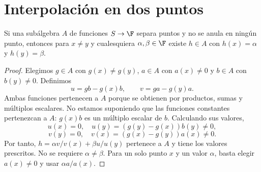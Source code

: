 \section{Interpolación en dos puntos}
\begin{lema}\label{ch28:interpolacion}
Si una subálgebra $A$ de funciones $S\to\F$ separa puntos y no se anula en ningún punto, entonces para $x\ne y$ y cualesquiera $\alpha,\beta\in\F$ existe $h\in A$ con $h(x)=\alpha$ y $h(y)=\beta$.
\end{lema}
\begin{proof}
Elegimos $g\in A$ con $g(x)\ne g(y)$, $a\in A$ con $a(x)\ne0$ y $b\in A$ con $b(y)\ne0$. Definimos
\[
 u=gb-g(x)b,\qquad v=ga-g(y)a.
\]
Ambas funciones pertenecen a $A$ porque se obtienen por productos, sumas y múltiplos escalares. No estamos suponiendo que las funciones constantes pertenezcan a $A$: $g(x)b$ es un múltiplo escalar de $b$. Calculando sus valores,
\[
 u(x)=0,\quad u(y)=(g(y)-g(x))b(y)\ne0,
\]
\[
 v(y)=0,\quad v(x)=(g(x)-g(y))a(x)\ne0.
\]
Por tanto,
$h=\alpha v/v(x)+\beta u/u(y)$ pertenece a $A$ y tiene los valores prescritos. No se requiere $\alpha\ne\beta$. Para un solo punto $x$ y un valor $\alpha$, basta elegir $a(x)\ne0$ y usar $\alpha a/a(x)$.
\end{proof}

